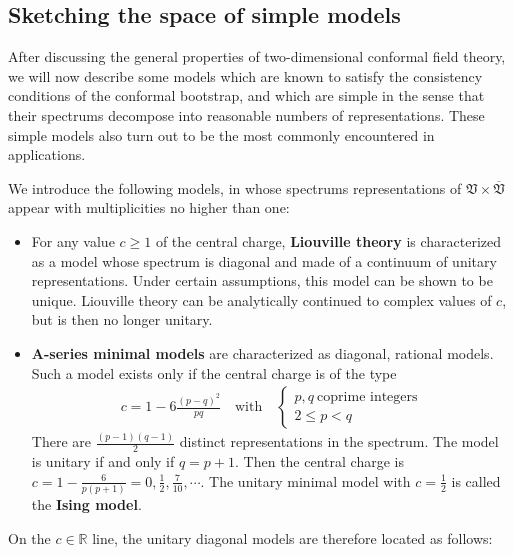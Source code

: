 \documentclass[12pt,a4paper,notitlepage]{report}
\numberwithin{equation}{section}
\theoremstyle{break}
\begin{document}
\subsection{Sketching the space of simple models \label{secmomo}}

After discussing the general properties of two-dimensional conformal field theory, we will now describe some models which are known to satisfy the consistency conditions of the conformal bootstrap, and which are simple in the sense that their spectrums decompose into reasonable numbers of representations.
These simple models also turn out to be the most commonly encountered in applications.  

We introduce the following models, in whose spectrums representations of $\mathfrak{V}\times \overline{\mathfrak{V}}$ appear with multiplicities no higher than one:
\begin{itemize}
 \item For any value $c\geq 1$ of the central charge, \textbf{\boldmath Liouville theory} is characterized as a model whose spectrum is diagonal and made of a continuum of unitary representations.
Under certain assumptions, this model can be shown to be unique.
Liouville theory can be analytically continued to complex values of $c$, but is then no longer unitary.
\item \textbf{\boldmath A-series minimal models} are characterized as diagonal, rational models.
Such a model exists only if the central charge is of the type 
\begin{align}
 c = 1 - 6 \frac{(p-q)^2}{pq}  \quad \text{with} \quad \left\{\begin{array}{l}  p,q \ \text{coprime \ integers} \\ 2\leq p<q \end{array}\right.  
\label{cpq}
\end{align}
There are $\frac{(p-1)(q-1)}{2}$ distinct representations in the spectrum.
The model is unitary if and only if $q=p+1$.
Then the central charge is $c=1-\frac{6}{p(p+1)}=0,\frac12,\frac{7}{10},\cdots$.
The unitary minimal model with $c=\frac12$ is called the \textbf{\boldmath Ising model}.
\end{itemize}
On the $c\in{\mathbb{R}}$ line, the unitary diagonal models are therefore located as follows:
\begin{center}
\end{center}
\end{document}
